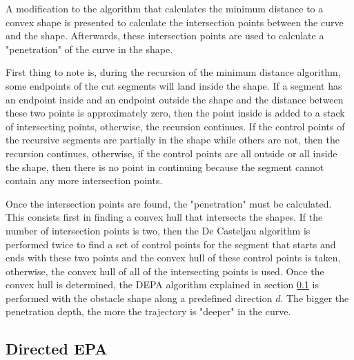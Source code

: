 \par A modification to the algorithm that calculates the minimum distance to a convex shape is presented to calculate the intersection points between the curve and the shape. Afterwards, these intersection points are used to calculate a "penetration" of the curve in the shape.
\par First thing to note is, during the recursion of the minimum distance algorithm, some endpoints of the cut segments will land inside the shape. If a segment has an endpoint inside and an endpoint outside the shape and the distance between these two points is approximately zero, then the point inside is added to a stack of intersecting points, otherwise, the recursion continues. If the control points of the recursive segments are partially in the shape while others are not, then the recursion continues, otherwise, if the control points are all outside or all inside the shape, then there is no point in continuing because the segment cannot contain any more intersection points.
\par Once the intersection points are found, the "penetration" must be calculated. This consists first in finding a convex hull that intersects the shapes. If the number of intersection points is two, then the De Casteljau algorithm is performed twice to find a set of control points for the segment that starts and ends with these two points and the convex hull of these control points is taken, otherwise, the convex hull of all of the intersecting points is used. Once the convex hull is determined, the \ac{DEPA} algorithm explained in section \ref{sec:epaalg}  is performed with the obstacle shape along a predefined direction $d$. The bigger the penetration depth, the more the trajectory is "deeper" in the curve.



\subsection{Directed EPA}
\label{sec:epaalg}



